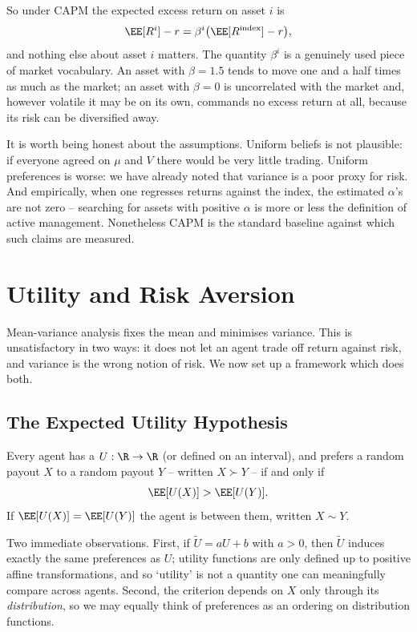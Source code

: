 So under CAPM the expected excess return on asset $i$ is
$$
\EE[R^i] - r = \beta^i\big(\EE[R^{\mathrm{index}}] - r\big),
$$
and nothing else about asset $i$ matters. The quantity $\beta^i$ is a genuinely used piece of market vocabulary. An asset with $\beta = 1.5$ tends to move one and a half times as much as the market; an asset with $\beta = 0$ is uncorrelated with the market and, however volatile it may be on its own, commands no excess return at all, because its risk can be diversified away.

\begin{remark}
	It is worth being honest about the assumptions. Uniform beliefs is not plausible: if everyone agreed on $\mu$ and $V$ there would be very little trading. Uniform preferences is worse: we have already noted that variance is a poor proxy for risk. And empirically, when one regresses returns against the index, the estimated $\alpha$'s are not zero -- searching for assets with positive $\alpha$ is more or less the definition of active management. Nonetheless CAPM is the standard baseline against which such claims are measured.
\end{remark}

\section{Utility and Risk Aversion}

Mean-variance analysis fixes the mean and minimises variance. This is unsatisfactory in two ways: it does not let an agent trade off return against risk, and variance is the wrong notion of risk. We now set up a framework which does both.

\subsection{The Expected Utility Hypothesis}

\begin{definition}
	Every agent has a  $U : \R \to \R$ (or defined on an interval), and prefers a random payout $X$ to a random payout $Y$ -- written $X \succ Y$ -- if and only if
	$$
	\EE[U(X)] > \EE[U(Y)].
	$$
	If $\EE[U(X)] = \EE[U(Y)]$ the agent is  between them, written $X \sim Y$.
\end{definition}

Two immediate observations. First, if $\tilde U = aU + b$ with $a > 0$, then $\tilde U$ induces exactly the same preferences as $U$; utility functions are only defined up to positive affine transformations, and so `utility' is not a quantity one can meaningfully compare across agents. Second, the criterion depends on $X$ only through its \emph{distribution}, so we may equally think of preferences as an ordering on distribution functions.

